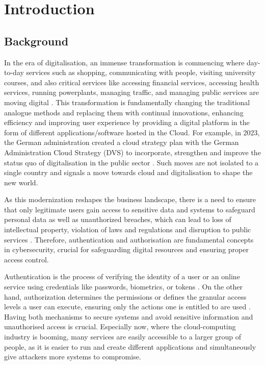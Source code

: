 \chapter{Introduction}
\section{Background}
In the era of digitalisation, an immense transformation is commencing where day-to-day services such as shopping, communicating with people, visiting university courses, and also critical services like accessing financial services, accessing health services, running powerplants, managing traffic, and managing public services are moving digital \citep{intro_cloud_critical_infra}. This transformation is fundamentally changing the traditional analogue methods and replacing them with continual innovations, enhancing efficiency and improving user experience by providing a digital platform in the form of different applications/software hosted in the Cloud. For example, in 2023, the German administration created a cloud strategy plan with the German Administration Cloud Strategy (DVS) to incorporate, strengthen and improve the status quo of digitalisation in the public sector \citep{german_gov_cloud_plan}. Such moves are not isolated to a single country and signals a move towards cloud and digitalisation to shape the new world. \newline

As this modernization reshapes the business landscape, there is a need to ensure that only legitimate users gain access to sensitive data and systems to safeguard personal data as well as unauthorized breaches, which can lead to loss of intellectual property, violation of laws and regulations and disruption to public services \citep{critical_infra_reason}. Therefore, authentication and authorisation are fundamental concepts in cybersecurity, crucial for safeguarding digital resources and ensuring proper access control. \newline

Authentication is the process of verifying the identity of a user or an online service using credentials like passwords, biometrics, or tokens \citep{authetication_intro}. On the other hand, authorization determines the permissions or defines the granular access levels a user can execute, ensuring only the actions one is entitled to are used \citep{Gollmann2021-at}. Having both mechanisms to secure systems and avoid sensitive information and unauthorised access is crucial. Especially now, where the cloud-computing industry is booming, many services are easily accessible to a larger group of people, as it is easier to run and create different applications and simultaneously give attackers more systems to compromise.\newline

